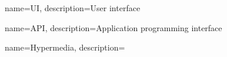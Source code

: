 {
    name={UI},
    description={User interface}
}

{
    name={API},
    description={Application programming interface}
}

{
    name={Hypermedia},
    description={}
}
